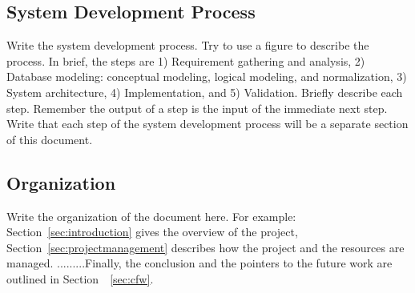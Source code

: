 \subsection{System Development Process}\label{subsec:sdp}
Write the system development process. Try to use a figure to describe the process. In brief, the  steps are 1) Requirement gathering and analysis, 2) Database modeling: conceptual modeling, logical modeling, and normalization, 3) System architecture, 4) Implementation, and 5) Validation. Briefly describe each step. Remember the output of a step is the  input of the immediate next step. Write that each step of the system development process will be a separate section of this document.
\begin{comment}


To design a database, one should follow the following steps:
\begin{enumerate}
\item Requirement analysis
	\begin{itemize}
		\item[-] interviewing, documentation, etc .
	\end{itemize}

\item Mapping onto a conceptual model (conceptual design)
     \begin{itemize}
     	\item[-] ER model
     \end{itemize}
\item Mapping onto a data model (logical design)
	\begin{itemize}
     	\item[-] Relational model, object model etc. 
     \end{itemize}
\item Normalization
\item System Architecture
\item Realization and Implementation (physical design)    
    
\end{enumerate}
\end{comment}


\subsection{Organization} Write the organization of the document here. For example: Section~\ref{sec:introduction} gives the overview of the project, Section~\ref{sec:projectmanagement} describes how the project and the resources are managed. .........Finally, the conclusion and the pointers to the future work are outlined in Section~~\ref{sec:cfw}.

\clearpage